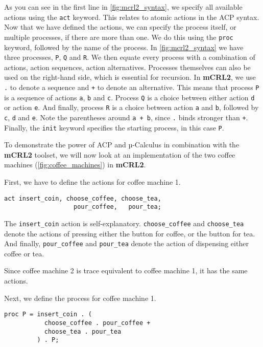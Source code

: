 \documentclass{clseminar}
\begin{document}
  As you can see in the first line in \autoref{fig:mcrl2_syntax}, we specify all available actions using the \texttt{act} keyword. This relates to atomic actions in the ACP syntax. Now that we have defined the actions, we can specify the process itself, or multiple processes, if there are more than one. We do this using the \texttt{proc} keyword, followed by the name of the process. In \autoref{fig:mcrl2_syntax} we have three processes, \texttt{P}, \texttt{Q} and \texttt{R}. We then equate every process with a combination of actions, action sequences, action alternatives. Processes themselves can also be used on the right-hand side, which is essential for recursion. In \textbf{mCRL2}, we use \texttt{.} to denote a sequence and \texttt{+} to denote an alternative. This means that process \texttt{P} is a sequence of actions \texttt{a}, \texttt{b} and \texttt{c}. Process \texttt{Q} is a choice between either action \texttt{d} or action \texttt{e}. And finally, process \texttt{R} is a choice between action \texttt{a} and \texttt{b}, followed by \texttt{c}, \texttt{d} and \texttt{e}. Note the parentheses around \texttt{a + b}, since \texttt{.} binds stronger than \texttt{+}. Finally, the \texttt{init} keyword specifies the starting process, in this case \texttt{P}.

  To demonstrate the power of ACP and µ-Calculus in combination with the \textbf{mCRL2} toolset, we will now look at an implementation of the two coffee machines (\autoref{fig:coffee_machines}) in \textbf{mCRL2}.

  First, we have to define the actions for coffee machine 1.

  \begin{lstlisting}[language=mCRL2]
act insert_coin, choose_coffee, choose_tea,
                   pour_coffee,   pour_tea;
  \end{lstlisting}

  The \texttt{insert\_coin} action is self-explanatory. \texttt{choose\_coffee} and \texttt{choose\_tea} denote the actions of pressing either the button for coffee, or the button for tea. And finally, \texttt{pour\_coffee} and \texttt{pour\_tea} denote the action of dispensing either coffee or tea.

  Since coffee machine 2 is trace equivalent to coffee machine 1, it has the same actions.

  Next, we define the process for coffee machine 1.

  \begin{lstlisting}[language=mCRL2]
proc P = insert_coin . (
           choose_coffee . pour_coffee +
           choose_tea . pour_tea
         ) . P;
  \end{lstlisting}
\end{document}
